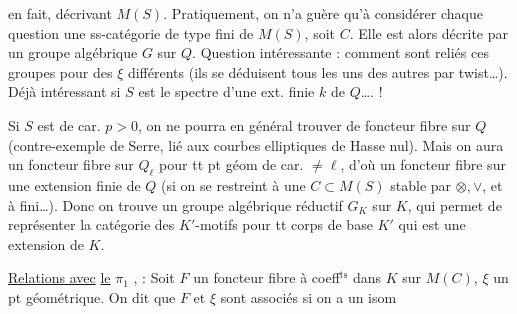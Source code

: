 en fait,  décrivant $M(S)$. Pratiquement, on n'a guère qu'à considérer   chaque question une ss-catégorie de type fini de $M(S)$, soit $C$. Elle est alors décrite par un  groupe algébrique  $G$ sur $Q$. Question intéressante : comment sont reliés ces groupes pour des $\xi$ différents (ils se déduisent tous les uns des autres par twist\ldots). Déjà intéressant si $S$ est le spectre d'une ext. finie $k$ de $Q$\ldots. !

Si $S$ est de car. $p>0$, on ne pourra en général trouver de foncteur fibre sur $Q$ (contre-exemple de Serre, lié aux courbes elliptiques de Hasse nul). Mais on aura un foncteur fibre sur $Q_\ell$ pour tt pt géom de car. $\ne\ell$, d'où un foncteur fibre sur une extension finie  de $Q$ (si on se restreint à une $C\subset M(S)$ stable par  $\otimes,\vee$, et à \uline{} fini\ldots). Donc on trouve un groupe algébrique réductif $G_K$ sur $K$, qui permet de représenter la catégorie des $K'$-motifs pour tt corps de base $K'$ qui est une extension de $K$.

\margin{////}
 \uline{Relations avec} \uline{le} $\pi_1$ \uline{}, :  Soit $F$ un foncteur fibre à coeff$^{\mathrm{ts}}$ dans $K$ sur $M(C)$, $\xi$ un pt géométrique. On dit que $F$ et $\xi$ sont associés si on a un isom

